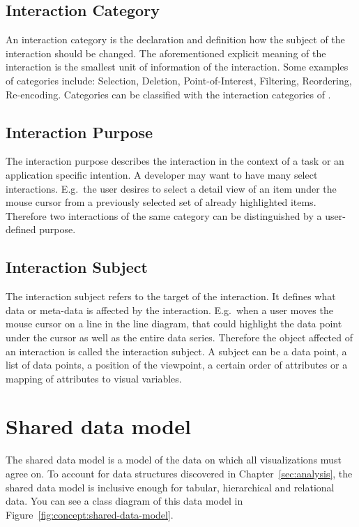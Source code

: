 \subsection{Interaction Category}
An interaction category is the declaration and definition how the subject of the interaction should be changed.
The aforementioned explicit meaning of the interaction is the smallest unit of information of the interaction.
Some examples of categories include: Selection, Deletion, Point-of-Interest, Filtering, Reordering, Re-encoding.
Categories can be classified with the interaction categories of \textcite{Yi2007}.

\subsection{Interaction Purpose}
The interaction purpose describes the interaction in the context of a task or an application specific intention.
A developer may want to have many select interactions.
E.g.\ the user desires to select a detail view of an item under the mouse cursor from a previously selected set of already highlighted items.
Therefore two interactions of the same category can be distinguished by a user-defined purpose.

\subsection{Interaction Subject}
The interaction subject refers to the target of the interaction.
It defines what data or meta-data is affected by the interaction.
E.g.\ when a user moves the mouse cursor on a line in the line diagram, that could highlight the data point under the cursor as well as the entire data series.
Therefore the object affected of an interaction is called the interaction subject.
A subject can be a data point, a list of data points, a position of the viewpoint, a certain order of attributes or a mapping of attributes to visual variables.



\section{Shared data model}\label{sec:concept:data-model}
The shared data model is a model of the data on which all visualizations must agree on.
To account for  data structures discovered in Chapter~\ref{sec:analysis}, the shared data model is inclusive enough for tabular, hierarchical and relational data.
You can see a class diagram of this data model in Figure~\ref{fig:concept:shared-data-model}.

